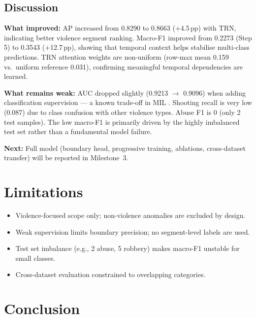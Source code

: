 \documentclass[11pt]{article}
\begin{document}
\subsection{Discussion}

\textbf{What improved:}
AP increased from 0.8290 to 0.8663 (+4.5\,pp) with TRN, indicating better
violence segment ranking.
Macro-F1 improved from 0.2273 (Step 5) to 0.3543 (+12.7\,pp), showing that
temporal context helps stabilise multi-class predictions.
TRN attention weights are non-uniform (row-max mean 0.159 vs.\ uniform reference
0.031), confirming meaningful temporal dependencies are learned.

\textbf{What remains weak:}
AUC dropped slightly (0.9213 $\to$ 0.9096) when adding classification
supervision --- a known trade-off in MIL \citep{tian2021weakly}.
Shooting recall is very low (0.087) due to class confusion with other
violence types.
Abuse F1 is 0 (only 2 test samples).
The low macro-F1 is primarily driven by the highly imbalanced test set rather
than a fundamental model failure.

\textbf{Next:}
Full model (boundary head, progressive training, ablations, cross-dataset
transfer) will be reported in Milestone~3.

\section{Limitations}

\begin{itemize}
\item Violence-focused scope only; non-violence anomalies are excluded by design.
\item Weak supervision limits boundary precision; no segment-level labels are used.
\item Test set imbalance (e.g., 2 abuse, 5 robbery) makes macro-F1 unstable
      for small classes.
\item Cross-dataset evaluation constrained to overlapping categories.
\end{itemize}

\section{Conclusion}
\end{document}
